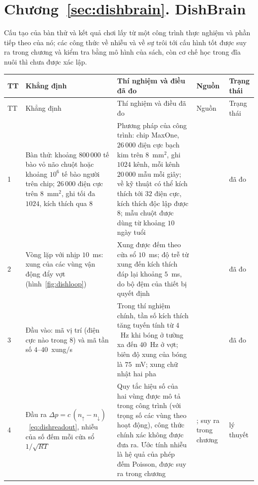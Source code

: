 \section{Chương~\ref{sec:dishbrain}. DishBrain}

Cấu tạo của bàn thử và kết quả chơi lấy từ một công trình thực nghiệm và phần tiếp theo của nó; các công thức về nhiễu và về sự trôi tới cấu hình tốt được suy ra trong chương và kiểm tra bằng mô hình của sách, còn cơ chế học trong đĩa nuôi thì chưa được xác lập.

{\footnotesize
\setlength{\tabcolsep}{3pt}\renewcommand{\arraystretch}{1.15}
\begin{longtable}{>{\raggedright}p{0.5cm}>{\raggedright}p{4.0cm}>{\raggedright}p{5.6cm}>{\raggedright}p{2.3cm}>{\raggedright\arraybackslash}p{1.7cm}}
\toprule
TT & Khẳng định & Thí nghiệm và điều đã đo & Nguồn & Trạng thái \\
\midrule\endfirsthead
\toprule
TT & Khẳng định & Thí nghiệm và điều đã đo & Nguồn & Trạng thái \\
\midrule\endhead
1 & Bàn thử: khoảng $800\,000$ tế bào vỏ não chuột hoặc khoảng $10^6$ tế bào người trên chip; $26\,000$ điện cực trên $8$~mm$^2$, ghi tối đa $1024$, kích thích qua $8$ & Phương pháp của công trình: chip MaxOne, $26\,000$ điện cực bạch kim trên $8$~mm$^2$, ghi $1024$ kênh, mỗi kênh $20\,000$ mẫu mỗi giây; về kỹ thuật có thể kích thích tới $32$ điện cực, kích thích độc lập được $8$; mẫu chuột được dùng từ khoảng $10$ ngày tuổi & \cite{Kagan2022} & đã đo \\
2 & Vòng lặp với nhịp $10$~ms: xung của các vùng vận động đẩy vợt (hình~\ref{fig:dishloop}) & Xung được đếm theo cửa sổ $10$~ms; độ trễ từ xung đến kích thích đáp lại khoảng $5$~ms, do bộ đệm của thiết bị quyết định & \cite{Kagan2022} & đã đo \\
3 & Đầu vào: mã vị trí (điện cực nào trong $8$) và mã tần số $4$--$40$~xung/s & Trong thí nghiệm chính, tần số kích thích tăng tuyến tính từ $4$~Hz khi bóng ở tường xa đến $40$~Hz ở vợt; biên độ xung của bóng là $75$~mV; xung chữ nhật hai pha & \cite{Kagan2022} & đã đo \\
4 & Đầu ra $\Delta p=c\,(n_\uparrow-n_\downarrow)$~\eqref{eq:dishreadout}, nhiễu của số đếm mỗi cửa sổ $1/\sqrt{RT}$ & Quy tắc hiệu số của hai vùng được mô tả trong công trình (với trọng số các vùng theo hoạt động), công thức chính xác không được đưa ra. Ước tính nhiễu là hệ quả của phép đếm Poisson, được suy ra trong chương & \cite{Kagan2022}; suy ra trong chương & lý thuyết \\

\end{longtable}}
